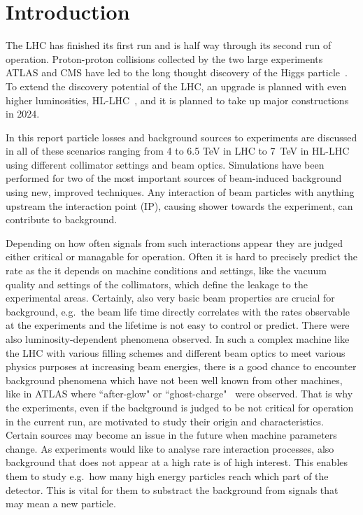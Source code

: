 \section{Introduction}


The LHC has finished its first run and is half way through its second run of operation. Proton-proton collisions collected by the two large experiments ATLAS and CMS have led to the long thought discovery of the Higgs particle~\cite{Aad20121,Chatrchyan201230}. To extend the discovery potential of the LHC, an upgrade is planned with even higher luminosities, HL-LHC~\cite{hl-lhc-prel-design}, and it is planned to take up major constructions in 2024.

In this report particle losses and background sources to experiments are discussed in all of these scenarios ranging from 4 to 6.5 TeV in LHC to 7~TeV in HL-LHC using different collimator settings and beam optics. Simulations have been performed for two of the most important sources of beam-induced background using new, improved techniques. Any interaction of beam particles with anything upstream the interaction point (IP), causing shower towards the experiment, can contribute to background.

Depending on how often signals from such interactions appear they are judged either critical or managable for operation. Often it is hard to precisely predict the rate as the it depends on machine conditions and settings, like the vacuum quality and settings of the collimators, which define the leakage to the experimental areas. Certainly, also very basic beam properties are crucial for background, e.g.~the beam life time directly correlates with the rates observable at the experiments and the lifetime is not easy to control or predict. There were also luminosity-dependent phenomena observed. In such a complex machine like the LHC with various filling schemes and different beam optics to meet various physics purposes at increasing beam energies, there is a good chance to encounter background phenomena which have not been well known from other machines, like in ATLAS where ``after-glow" or ``ghost-charge"~\cite{ATLAS_JINST_13} were observed. That is why the experiments, even if the background is judged to be not critical for operation in the current run, are motivated to study their origin and characteristics. Certain sources may become an issue in the future when machine parameters change. As experiments would like to analyse rare interaction processes, also background that does not appear at a high rate is of high interest. This enables them to study e.g.~how many high energy particles reach which part of the detector. This is vital for them to substract the background from signals that may mean a new particle. 

